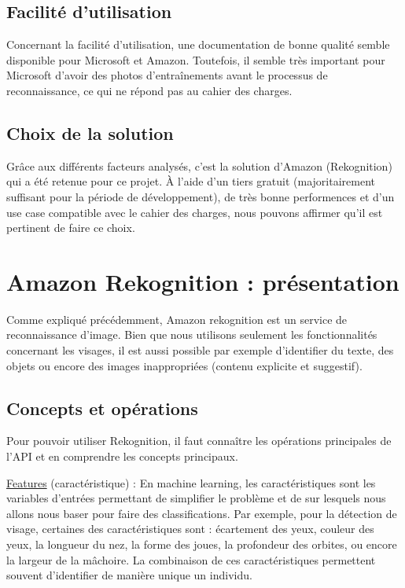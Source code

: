 \subsection{Facilité d’utilisation}
Concernant la facilité d’utilisation, une documentation de bonne qualité semble disponible pour Microsoft et
Amazon. Toutefois, il semble très important pour Microsoft d’avoir des photos d’entraînements avant le processus
de reconnaissance, ce qui ne répond pas au cahier des charges.

\subsection{Choix de la solution}
Grâce aux différents facteurs analysés, c’est la solution d’Amazon (Rekognition) qui a été retenue pour ce projet. À
l’aide d’un tiers gratuit (majoritairement suffisant pour la période de développement), de très bonne performences
et d’un use case compatible avec le cahier des charges, nous pouvons affirmer qu’il est pertinent de faire ce choix.

\section{Amazon Rekognition : présentation}
Comme expliqué précédemment, Amazon rekognition est un service de reconnaissance d’image. Bien que nous
utilisons seulement les fonctionnalités concernant les visages, il est aussi possible par exemple d’identifier du texte,
des objets ou encore des images inappropriées (contenu explicite et suggestif).

\subsection{Concepts et opérations}
Pour pouvoir utiliser Rekognition, il faut connaître les opérations principales de l’API et en comprendre les concepts
principaux.

\underline{Features} (caractéristique) : En machine learning, les caractéristiques sont les variables d’entrées permettant de
simplifier le problème et de sur lesquels nous allons nous baser pour faire des classifications. Par exemple, pour la
détection de visage, certaines des caractéristiques sont : écartement des yeux, couleur des yeux, la longueur du
nez, la forme des joues, la profondeur des orbites, ou encore la largeur de la mâchoire. La combinaison de ces
caractéristiques permettent souvent d’identifier de manière unique un individu.

